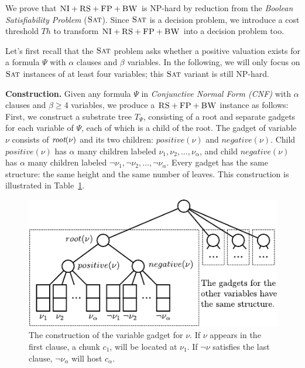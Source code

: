 \documentclass[conference,10pt]{IEEEtran}
\newcommand{\variab}{\nu}
\newcommand{\aroot}{\emph{root}}
\newcommand{\clauses}{\alpha}
\newcommand{\variables}{\beta}
\newcommand{\achunk}{\ensuremath{c}}
\newcommand{\CC}{\textsc{NI}}
\newcommand{\FP}{\textsc{FP}}
\newcommand{\RS}{\textsc{RS}}
\newcommand{\BW}{\textsc{BW}}
\newcommand{\Tree}{\ensuremath{T}}
\newcommand{\SAT}{\textsc{Sat}}
\newcommand{\Formula}{\ensuremath{\Psi}}
\newcommand{\Thr}{\ensuremath{Th}}
\newcommand{\positive}{\ensuremath{positive}}
\newcommand{\negative}{\ensuremath{negative}}
\begin{document}
\begin{appendix}

We prove that $\CC+\RS+\FP+\BW$ is NP-hard by reduction from the \emph{Boolean Satisfiability Problem} ($\SAT$).
Since $\SAT$ is a decision
problem, we
introduce a cost threshold $\Thr$ to transform $\CC+\RS+\FP+\BW$ into a decision problem too.

Let's first recall that the $\SAT$ problem asks whether a positive valuation exists
for a formula $\Formula$ with $\clauses$ clauses and $\variables$
variables.
In the following, we will only focus on $\SAT$ instances of at least four variables;
this $\SAT$ variant is still NP-hard.

\textbf{Construction.}
Given any formula $\Formula$ in \emph{Conjunctive Normal Form (CNF)} with
$\clauses$ clauses and $\variables \geq 4$ variables, we produce
a $\RS+\FP+\BW$ instance as follows: First, we construct a substrate tree
$\Tree_{\Formula}$, consisting of
a root and separate gadgets for each variable of $\Formula$, each of which
is a child of the root.
The gadget of variable $\variab$ consists of $\aroot(\variab)$ and its two children:
$\positive(\variab)$ and $\negative(\variab)$. Child $\positive(\variab)$ has $\clauses$
many children labeled $\nu_1, \nu_2, \ldots,
\nu_{\clauses}$, and child
$\negative(\variab)$ has
$\clauses$ many children labeled $\neg \nu_1, \neg \nu_2, \dots,
\neg \nu_{\clauses}$. Every
gadget has the same structure: the same height and the same number of
leaves. This construction is illustrated in
Table~\ref{fig:construction_3sat}.


\begin{figure}
\includegraphics[width=\columnwidth]{figs/construction_3sat}
\caption{The construction of the variable gadget for $\nu$. If 
$\nu$ appears in the
first clause, a chunk $\achunk_1$, will be located at $\nu_1$. If $\neg \nu$
satisfies the last clause, $\neg
\nu_\alpha$ will host $\achunk_\alpha$.}
\label{fig:construction_3sat}
\end{figure}


\end{appendix}
\end{document}

